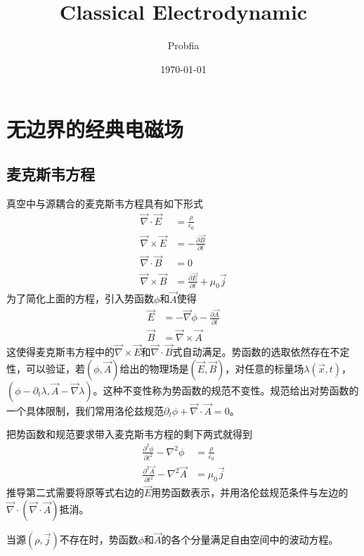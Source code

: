 \documentclass[a4paper,11pt]{ctexart}
\title{Classical Electrodynamic}
\author{Probfia}
\date{\today}
\newcommand{\bea}{\begin{equation}\begin{aligned}}
\newcommand{\eea}{\end{aligned}\end{equation}}
\newcommand{\del}{\vec{\nabla}}
\newcommand{\epv}{\epsilon_0}
\newcommand{\pfrac}[2]{\frac{\partial #1}{\partial #2}}
\begin{document}
\maketitle
\tableofcontents



\section{无边界的经典电磁场}
\subsection{麦克斯韦方程}
真空中与源耦合的麦克斯韦方程具有如下形式
\bea \label{maxeq}
\del \cdot \vec{E} &= \frac{\rho}{\epv} \\
\del \times \vec{E} &= -\pfrac{\vec{B}}{t} \\
\del \cdot \vec{B} &= 0 \\ 
\del \times \vec{B} &= \pfrac{\vec{E}}{t}+ \mu_0 \vec{j}
\eea
为了简化上面的方程，引入势函数$\phi$和$\vec{A}$使得
\bea
\vec{E} &= -\del \phi - \pfrac{\vec{A}}{t} \\
\vec{B} & = \del \times \vec{A}
\eea
这使得麦克斯韦方程中的$\del \times \vec{E}$和$\del \cdot \vec{B}$式自动满足。势函数的选取依然存在不定性，可以验证，若$(\phi,\vec A)$给出的物理场是$( \vec E , \vec B )$，对任意的标量场$\lambda (\vec{x},t)$，$(\phi -\partial_t \lambda, \vec A - \del \lambda )$。这种不变性称为势函数的规范不变性。规范给出对势函数的一个具体限制，我们常用洛伦兹规范$\partial_t \phi + \del \cdot \vec A = 0$。
\par
把势函数和规范要求带入麦克斯韦方程的剩下两式就得到
\bea \label{maxpot}
\frac{\partial^2 \phi}{\partial t^2} - \nabla^2 \phi &= \frac{\rho }{\epv} \\
\frac{\partial^2 \vec A}{\partial t^2} - \nabla^2 \vec A &= \mu_0 \vec j 
\eea
推导第二式需要将原等式右边的$\vec E$用势函数表示，并用洛伦兹规范条件与左边的$\del \cdot ( \del \cdot \vec A)$抵消。
\par
当源$(\rho, \vec j )$不存在时，势函数$\phi$和$\vec A$的各个分量满足自由空间中的波动方程。
\end{document}
